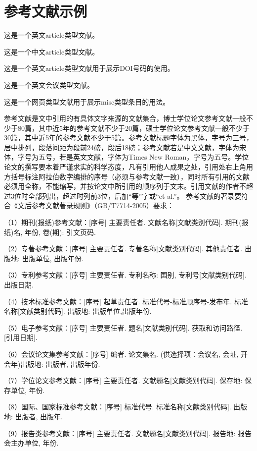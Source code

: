 \chapter{参考文献示例}
这是一个英文article类型文献\cite{ChangHTD19}。
\par
这是一个中文article类型文献\cite{WangZSS21}。
\par
这是一个英文article类型文献\cite{GongL21}用于展示DOI号码的使用。
\par
这是一个英文会议类型文献\cite{TsaiCLQLB13}。
\par
这是一个网页类型文献\cite{Collinson21}用于展示misc类型条目的用法。

参考文献是文中引用的有具体文字来源的文献集合，博士学位论文参考文献一般不少于80篇，其中近5年的参考文献不少于20篇，硕士学位论文参考文献一般不少于30篇，其中近5年的参考文献不少于5篇。参考文献标题字体为黑体，字号为三号，居中排列，段落间距为段前24磅，段后18磅；参考文献若是中文文献，字体为宋体，字号为五号，若是英文文献，字体为Times New Roman，字号为五号。学位论文的撰写要本着严谨求实的科学态度，凡有引用他人成果之处，引用处右上角用方括号标注阿拉伯数字编排的序号（必须与参考文献一致），同时所有引用的文献必须用全称，不能缩写，并按论文中所引用的顺序列于文末。引用文献的作者不超过3位时全部列出，超过时列前3位，后加“等”字或“et al.”。 参考文献的著录要符合《文后参考文献著录规则》（GB/T7714-2005）要求：
\par
（1）期刊(报纸)参考文献：[序号] 主要责任者. 文献名称[文献类别代码]. 期刊(报纸)名, 年份, 卷(期): 引文页码.
\par
（2）专著参考文献：[序号] 主要责任者. 专著名称[文献类别代码]. 其他责任者. 出版地: 出版单位, 出版年份.
\par
（3）专利参考文献：[序号] 主要责任者. 专利名称: 国别, 专利号[文献类别代码]. 出版日期.
\par
（4）技术标准参考文献：[序号] 起草责任者. 标准代号-标准顺序号-发布年. 标准名称[文献类别代码]. 出版地: 出版单位,出版年份.
\par
（5）电子参考文献：[序号] 主要责任者. 题名[文献类别代码]. 获取和访问路径. [引用日期].
\par
（6）会议论文集参考文献：[序号] 编者. 论文集名. (供选择项：会议名, 会址, 开会年)出版地: 出版者, 出版年份.
\par
（7）学位论文参考文献：[序号]  主要责任者. 文献题名[文献类别代码]. 保存地: 保存单位, 年份.
\par
（8）国际、国家标准参考文献：[序号] 标准代号. 标准名称[文献类别代码]. 出版地: 出版者, 出版年.
\par
（9）报告类参考文献：[序号] 主要责任者. 文献题名[文献类别代码]. 报告地: 报告会主办单位, 年份.
